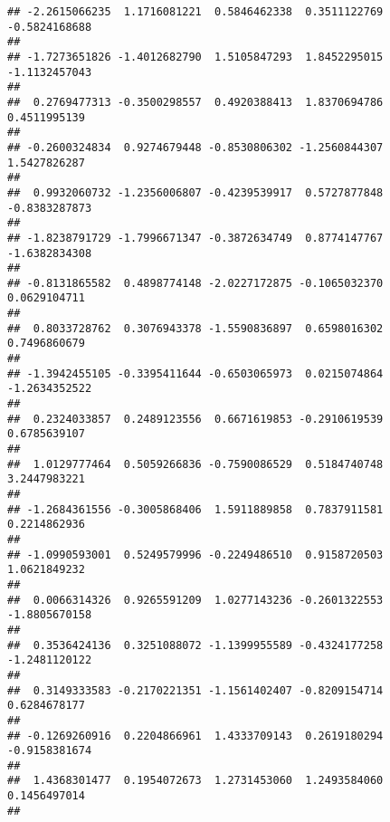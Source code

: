 \documentclass[]{article}
\begin{document}
\begin{verbatim}
## -2.2615066235  1.1716081221  0.5846462338  0.3511122769 -0.5824168688 
##                                                                       
## -1.7273651826 -1.4012682790  1.5105847293  1.8452295015 -1.1132457043 
##                                                                       
##  0.2769477313 -0.3500298557  0.4920388413  1.8370694786  0.4511995139 
##                                                                       
## -0.2600324834  0.9274679448 -0.8530806302 -1.2560844307  1.5427826287 
##                                                                       
##  0.9932060732 -1.2356006807 -0.4239539917  0.5727877848 -0.8383287873 
##                                                                       
## -1.8238791729 -1.7996671347 -0.3872634749  0.8774147767 -1.6382834308 
##                                                                       
## -0.8131865582  0.4898774148 -2.0227172875 -0.1065032370  0.0629104711 
##                                                                       
##  0.8033728762  0.3076943378 -1.5590836897  0.6598016302  0.7496860679 
##                                                                       
## -1.3942455105 -0.3395411644 -0.6503065973  0.0215074864 -1.2634352522 
##                                                                       
##  0.2324033857  0.2489123556  0.6671619853 -0.2910619539  0.6785639107 
##                                                                       
##  1.0129777464  0.5059266836 -0.7590086529  0.5184740748  3.2447983221 
##                                                                       
## -1.2684361556 -0.3005868406  1.5911889858  0.7837911581  0.2214862936 
##                                                                       
## -1.0990593001  0.5249579996 -0.2249486510  0.9158720503  1.0621849232 
##                                                                       
##  0.0066314326  0.9265591209  1.0277143236 -0.2601322553 -1.8805670158 
##                                                                       
##  0.3536424136  0.3251088072 -1.1399955589 -0.4324177258 -1.2481120122 
##                                                                       
##  0.3149333583 -0.2170221351 -1.1561402407 -0.8209154714  0.6284678177 
##                                                                       
## -0.1269260916  0.2204866961  1.4333709143  0.2619180294 -0.9158381674 
##                                                                       
##  1.4368301477  0.1954072673  1.2731453060  1.2493584060  0.1456497014 
##                                                                       

\end{verbatim}
\end{document}

